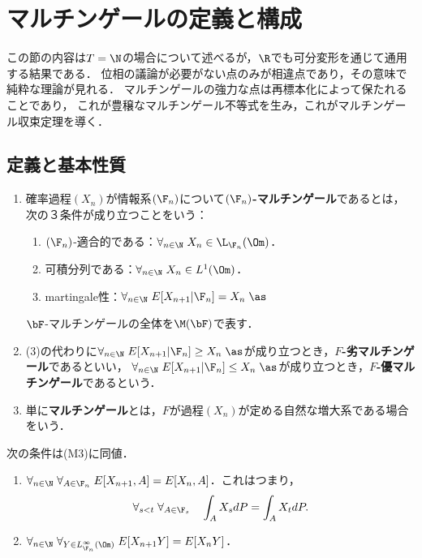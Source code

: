 \documentclass[uplatex,dvipdfmx]{jsreport}
\begin{document}
\section{マルチンゲールの定義と構成}

\begin{tcolorbox}[colframe=ForestGreen, colback=ForestGreen!10!white,breakable,colbacktitle=ForestGreen!40!white,coltitle=black,fonttitle=\bfseries\sffamily,
title=]
    この節の内容は$T=\N$の場合について述べるが，$\R$でも可分変形を通じて通用する結果である．
    位相の議論が必要がない点のみが相違点であり，その意味で純粋な理論が見れる．
    マルチンゲールの強力な点は再標本化によって保たれることであり，
    これが豊穣なマルチンゲール不等式を生み，これがマルチンゲール収束定理を導く．
\end{tcolorbox}

\subsection{定義と基本性質}

\begin{definition}\mbox{}
    \begin{enumerate}
        \item 確率過程$(X_n)$が情報系$(\F_n)$について\textbf{$(\F_n)$-マルチンゲール}であるとは，次の３条件が成り立つことをいう：
        \begin{enumerate}[({M}1)]
            \item $(\F_n)$-適合的である：$\forall_{n\in\N}\;X_n\in\L_{\F_n}(\Om)$．
            \item 可積分列である：$\forall_{n\in\N}\;X_n\in L^1(\Om)$．
            \item martingale性：$\forall_{n\in\N}\;E[X_{n+1}|\F_n]=X_n\;\as$
        \end{enumerate}
        $\bF$-マルチンゲールの全体を$\M(\bF)$で表す．
        \item (3)の代わりに$\forall_{n\in\N}\;E[X_{n+1}|\F_n]\ge X_n\;\as$が成り立つとき，\textbf{$F$-劣マルチンゲール}であるといい，
        $\forall_{n\in\N}\;E[X_{n+1}|\F_n]\le X_n\;\as$が成り立つとき，\textbf{$F$-優マルチンゲール}であるという．
        \item 単に\textbf{マルチンゲール}とは，$F$が過程$(X_n)$が定める自然な増大系である場合をいう．
    \end{enumerate}
\end{definition}
\begin{remarks}[定義の特徴付け]
    次の条件は(M3)に同値．
    \begin{enumerate}
        \item $\forall_{n\in\N}\;\forall_{A\in\F_n}\;E[X_{n+1},A]=E[X_n,A]$．これはつまり，
        \[\forall_{s<t}\;\forall_{A\in\F_s}\quad\int_AX_sdP=\int_AX_tdP.\]
        \item $\forall_{n\in\N}\;\forall_{Y\in L^\infty_{\F_n}(\Om)}\;E[X_{n+1}Y]=E[X_nY]$．
    \end{enumerate}
\end{remarks}
\end{document}
